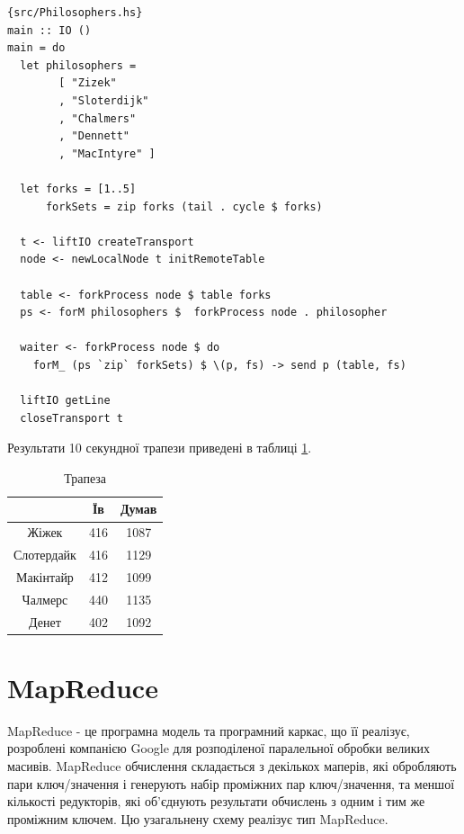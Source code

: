 \documentclass[12pt]{article}
\begin{document}
\begin{lstlisting}{src/Philosophers.hs}
main :: IO ()
main = do
  let philosophers =
        [ "Zizek"
        , "Sloterdijk"
        , "Chalmers"
        , "Dennett"
        , "MacIntyre" ]

  let forks = [1..5]
      forkSets = zip forks (tail . cycle $ forks)
  
  t <- liftIO createTransport
  node <- newLocalNode t initRemoteTable

  table <- forkProcess node $ table forks
  ps <- forM philosophers $  forkProcess node . philosopher

  waiter <- forkProcess node $ do
    forM_ (ps `zip` forkSets) $ \(p, fs) -> send p (table, fs)

  liftIO getLine
  closeTransport t
\end{lstlisting}

Результати 10 секундної трапези приведені в таблиці \ref{dinnerResults}.\\


\begin {table}[H]
\begin{center}
\begin{tabular}{ c|c|c } 
            & Їв          & Думав   \\ \hline
Жіжек       & 416         & 1087    \\ 
Слотердайк  & 416         & 1129    \\ 
Макінтайр   & 412         & 1099    \\ 
Чалмерс     & 440         & 1135    \\ 
Денет       & 402         & 1092    \\ 
\end{tabular}
\caption {Трапеза}
\label{dinnerResults}
\end{center}
\end {table}


\section{MapReduce}

MapReduce - це програмна модель та програмний каркас, що її реалізує, розроблені 
компанією Google для розподіленої паралельної обробки великих масивів. MapReduce 
обчислення складається з декількох маперів, які обробляють пари ключ/значення і 
генерують набір проміжних пар ключ/значення, та меншої кількості редукторів, які об'єднують 
результати обчислень з одним і тим же проміжним ключем. Цю узагальнену схему реалізує
тип MapReduce.\\
\end{document}

